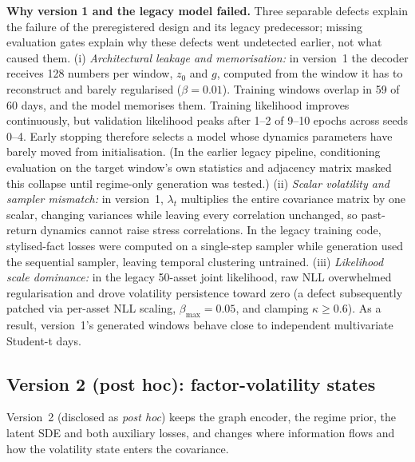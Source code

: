 \documentclass[journal]{IEEEtran}
\begin{document}
\textbf{Why version 1 and the legacy model failed.} Three separable defects explain the failure of the
preregistered design and its legacy predecessor; missing evaluation gates explain why these defects went
undetected earlier, not what caused them. (i) \emph{Architectural leakage and memorisation:} in version~1 the
decoder receives 128 numbers per window, $z_0$ and $g$, computed from the window it has to reconstruct and
barely regularised ($\beta=0.01$). Training windows overlap in 59 of 60 days, and the model memorises them.
Training likelihood improves continuously, but validation likelihood peaks after 1--2 of 9--10 epochs across
seeds 0--4. Early stopping therefore selects a model whose dynamics parameters have barely moved from
initialisation. (In the earlier legacy pipeline, conditioning evaluation on
the target window's own statistics and adjacency matrix masked this collapse until regime-only generation was
tested.) (ii) \emph{Scalar volatility and sampler mismatch:} in version~1, $\lambda_t$ multiplies the entire
covariance matrix by one scalar, changing variances while leaving every correlation unchanged, so past-return
dynamics cannot raise stress correlations. In the legacy training code, stylised-fact losses were
computed on a single-step sampler while generation used the sequential sampler, leaving temporal clustering
untrained. (iii) \emph{Likelihood scale dominance:} in the legacy 50-asset joint likelihood, raw NLL
overwhelmed regularisation and drove volatility persistence toward zero (a defect subsequently patched via
per-asset NLL scaling, $\beta_{\max}=0.05$, and clamping $\kappa \ge 0.6$). As a result, version~1's generated
windows behave close to independent multivariate Student-t days.

\subsection{Version 2 (post hoc): factor-volatility states}
Version~2 (disclosed as \emph{post hoc}) keeps the graph encoder, the regime prior, the latent SDE and both
auxiliary losses, and changes where information flows and how the volatility state enters the covariance.
\end{document}
